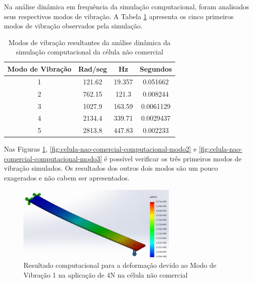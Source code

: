 \documentclass[a4paper]{instrumentacao}
\begin{document}
Na análise dinâmica em frequência da simulação computacional, foram analisados seus respectivos modos de vibração. A Tabela \ref{tab:celula-na-comercial-computacional-modos} apresenta os cinco primeiros modos de vibração observados pela simulação.

\begin{table}[H]
\centering
\caption{Modos de vibração resultantes da análise dinâmica da simulação computacional da célula não comercial}
\label{tab:celula-na-comercial-computacional-modos}
\begin{tabular}{|c|c|c|c|}
\hline
\textbf{Modo de Vibração} & \textbf{Rad/seg} & \textbf{Hz} & \textbf{Segundos} \\ \hline
1                         & 121.62           & 19.357      & 0.051662          \\ \hline
2                         & 762.15           & 121.3       & 0.008244          \\ \hline
3                         & 1027.9           & 163.59      & 0.0061129         \\ \hline
4                         & 2134.4           & 339.71      & 0.0029437         \\ \hline
5                         & 2813.8           & 447.83      & 0.002233          \\ \hline
\end{tabular}
\end{table}

Nas Figuras \ref{fig:celula-nao-comercial-computacional-modo1}, \ref{fig:celula-nao-comercial-computacional-modo2} e \ref{fig:celula-nao-comercial-computacional-modo3} é possível verificar os três primeiros modos de vibração simulados. Os resultados dos outros dois modos são um pouco exagerados e não cabem ser apresentados.

\begin{figure}[H]
\center
\includegraphics[width=0.7\textwidth]{CelulaNaoComercial_solid_modo1.jpg}
\caption{Resultado computacional para a deformação devido ao Modo de Vibração 1 na aplicação de 4N na célula não comercial}
\label{fig:celula-nao-comercial-computacional-modo1}
\end{figure}
\end{document}
